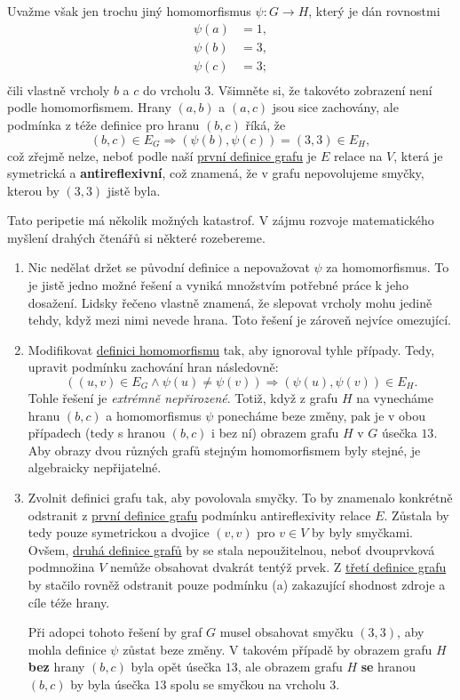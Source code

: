 Uvažme však jen trochu jiný homomorfismus $\psi: G \to H$, který je dán
rovnostmi
\begin{equation*}
 \begin{split}
  \psi(a) &= 1, \\
  \psi(b) &= 3, \\
  \psi(c) &= 3; \\
 \end{split}
\end{equation*}
čili vlastně  vrcholy $b$ a $c$ do vrcholu $3$. Všimněte si, že
takovéto zobrazení není podle 
homomorfismem. Hrany $(a,b)$ a $(a,c)$ jsou sice zachovány, ale podmínka z téže
definice pro hranu $(b,c)$ říká, že
\[
 (b,c) \in E_G \Rightarrow (\psi(b),\psi(c)) = (3,3) \in E_H,
\]
což zřejmě nelze, neboť podle naší \hyperref[def:graf-poprve]{první definice
grafu} je $E$ relace na $V$, která je symetrická a \textbf{antireflexivní}, což
znamená, že v grafu nepovolujeme smyčky, kterou by $(3,3)$ jistě byla.

Tato peripetie má několik možných katastrof. V zájmu rozvoje matematického
myšlení drahých čtenářů si některé rozebereme.

\begin{enumerate}
 \item Nic nedělat držet se původní definice a nepovažovat $\psi$ za
  homomorfismus. To je jistě jedno možné řešení a vyniká množstvím potřebné
  práce k jeho dosažení. Lidsky řečeno vlastně znamená, že slepovat vrcholy mohu
  jedině tehdy, když mezi nimi nevede hrana. Toto řešení je zároveň nejvíce
  omezující.
 \item Modifikovat \hyperref[def:grafovy-homomorfismus]{definici homomorfismu}
  tak, aby ignoroval tyhle případy. Tedy, upravit podmínku zachování hran
  následovně:
  \[
   ((u,v) \in E_G \wedge \psi(u) \neq \psi(v)) \Rightarrow (\psi(u),\psi(v)) \in
   E_H.
  \]
  Tohle řešení je \emph{extrémně nepřirozené}. Totiž, když z grafu $H$ na
   vynecháme hranu $(b,c)$ a homomorfismus $\psi$
  ponecháme beze změny, pak je v obou případech (tedy s hranou $(b,c)$ i bez ní)
  obrazem grafu $H$ v $G$ úsečka $13$. Aby obrazy dvou různých grafů stejným
  homomorfismem byly stejné, je algebraicky nepřijatelné.
 \item Zvolnit definici grafu tak, aby povolovala smyčky. To by znamenalo
  konkrétně odstranit z \hyperref[def:graf-poprve]{první definice grafu}
  podmínku antireflexivity relace $E$. Zůstala by tedy pouze symetrickou a
  dvojice $(v,v)$ pro $v \in V$ by byly smyčkami. Ovšem,
  \hyperref[def:graf-podruhe]{druhá definice grafů} by se stala nepoužitelnou,
  neboť dvouprvková podmnožina $V$ nemůže obsahovat dvakrát tentýž prvek. Z
  \hyperref[def:graf-potreti]{třetí definice grafu} by stačilo rovněž odstranit
  pouze podmínku (a) zakazující shodnost zdroje a cíle téže hrany.

  Při adopci tohoto řešení by graf $G$ musel obsahovat smyčku $(3,3)$, aby mohla
  definice $\psi$ zůstat beze změny. V takovém případě by obrazem grafu $H$
  \textbf{bez} hrany $(b,c)$ byla opět úsečka $13$, ale obrazem grafu $H$
  \textbf{se} hranou $(b,c)$ by byla úsečka $13$ spolu se smyčkou na vrcholu
  $3$.
\end{enumerate}
